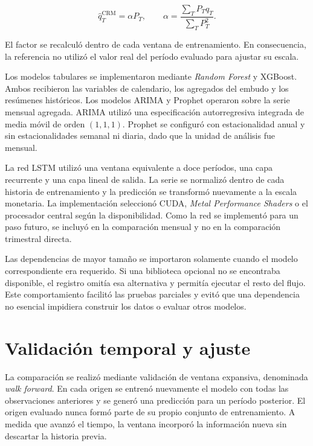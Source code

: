 \begin{equation}
    \label{eq:calibracionCRM}
    \hat{q}_T^{\mathrm{CRM}} = \alpha P_T,
    \qquad
    \alpha = \frac{\sum_T P_T q_T}{\sum_T P_T^2}.
\end{equation}

El factor se recalculó dentro de cada ventana de entrenamiento. En consecuencia, la referencia no utilizó el valor real del período evaluado para ajustar su escala.

Los modelos tabulares se implementaron mediante \textit{Random Forest} y XGBoost. Ambos recibieron las variables de calendario, los agregados del embudo y los resúmenes históricos. Los modelos ARIMA y Prophet operaron sobre la serie mensual agregada. ARIMA utilizó una especificación autorregresiva integrada de media móvil de orden $(1,1,1)$. Prophet se configuró con estacionalidad anual y sin estacionalidades semanal ni diaria, dado que la unidad de análisis fue mensual.

La red LSTM utilizó una ventana equivalente a doce períodos, una capa recurrente y una capa lineal de salida. La serie se normalizó dentro de cada historia de entrenamiento y la predicción se transformó nuevamente a la escala monetaria. La implementación seleccionó CUDA, \textit{Metal Performance Shaders} o el procesador central según la disponibilidad. Como la red se implementó para un paso futuro, se incluyó en la comparación mensual y no en la comparación trimestral directa.

Las dependencias de mayor tamaño se importaron solamente cuando el modelo correspondiente era requerido. Si una biblioteca opcional no se encontraba disponible, el registro omitía esa alternativa y permitía ejecutar el resto del flujo. Este comportamiento facilitó las pruebas parciales y evitó que una dependencia no esencial impidiera construir los datos o evaluar otros modelos.

\section{Validación temporal y ajuste}
\label{sec:validacionTemporalAjuste}

La comparación se realizó mediante validación de ventana expansiva, denominada \textit{walk forward}. En cada origen se entrenó nuevamente el modelo con todas las observaciones anteriores y se generó una predicción para un período posterior. El origen evaluado nunca formó parte de su propio conjunto de entrenamiento. A medida que avanzó el tiempo, la ventana incorporó la información nueva sin descartar la historia previa.

